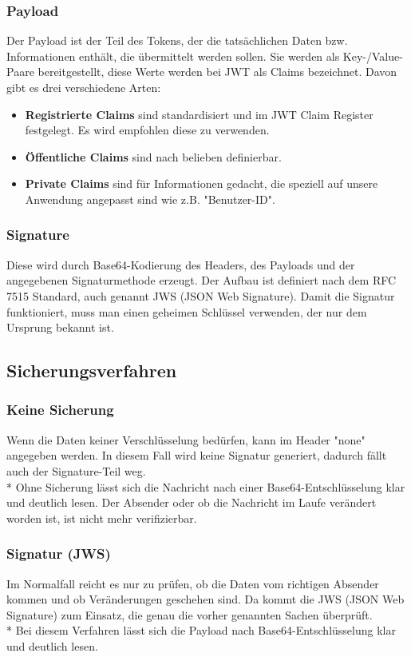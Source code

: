 \subsubsection{Payload}
Der Payload ist der Teil des Tokens, der die tatsächlichen Daten bzw. Informationen enthält, die übermittelt werden sollen.
Sie werden als Key-/Value-Paare bereitgestellt, diese Werte werden bei JWT als Claims bezeichnet. \cite{JWTIONOS}  Davon gibt es drei verschiedene Arten:
\begin{itemize}
    \item \textbf{Registrierte Claims} sind standardisiert und im JWT Claim Register festgelegt. Es wird empfohlen diese zu verwenden.
    \item \textbf{Öffentliche Claims} sind nach belieben definierbar.
    \item \textbf{Private Claims} sind für Informationen gedacht, die speziell auf unsere Anwendung angepasst sind wie z.B. "Benutzer-ID". \cite{JWTIONOS} 
\end{itemize}

\subsubsection{Signature}
Diese wird durch Base64-Kodierung des Headers, des Payloads und der angegebenen Signaturmethode erzeugt. Der Aufbau ist definiert nach dem RFC 7515 Standard, auch genannt JWS (JSON Web Signature).
Damit die Signatur funktioniert, muss man einen geheimen Schlüssel verwenden, der nur dem Ursprung bekannt ist. \cite{JWTIONOS} 

\subsection{Sicherungsverfahren}
\subsubsection{Keine Sicherung}
Wenn die Daten keiner Verschlüsselung bedürfen, kann im Header "none" angegeben werden. In diesem Fall wird keine Signatur generiert, dadurch fällt auch der Signature-Teil weg. \\*
Ohne Sicherung lässt sich die Nachricht nach einer Base64-Entschlüsselung klar und deutlich lesen. Der Absender oder ob die Nachricht im Laufe verändert worden ist, ist nicht mehr verifizierbar.\cite{JWTIONOS} 
\subsubsection{Signatur (JWS)}
Im Normalfall reicht es nur zu prüfen, ob die Daten vom richtigen Absender kommen und ob Veränderungen geschehen sind. Da kommt die JWS (JSON Web Signature) zum Einsatz, die genau die vorher genannten Sachen überprüft.
\\* Bei diesem Verfahren lässt sich die Payload nach Base64-Entschlüsselung klar und deutlich lesen. \cite{JWTIONOS}
